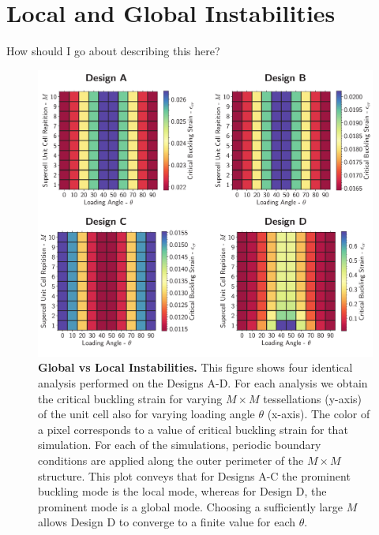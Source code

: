 \documentclass[10pt,twoside]{fernandes_supp}
\newcommand{\mf}[1]{\colorbox{blue!10}{\color{color3}#1}}
\begin{document}
\section{Local and Global Instabilities}
\mf{How should I go about describing this here?}
\begin{figure}
	\centering
	\includegraphics[width=0.7\linewidth]{SFig12.pdf}
	\caption{{\bf Global vs Local Instabilities.} This figure shows four identical analysis performed on the Designs A-D. For each analysis we obtain the critical buckling strain for varying $M\times M$ tessellations (y-axis) of the unit cell also for varying loading angle $\theta$ (x-axis). The color of a pixel corresponds to a value of critical buckling strain for that simulation. For each of the simulations, periodic boundary conditions are applied along the outer perimeter of the $M\times M$ structure. This plot conveys that for Designs A-C the prominent buckling mode is the local mode, whereas for Design D, the prominent mode is a global mode. Choosing a sufficiently large $M$ allows Design D to converge to a finite value for each $\theta$.}
	\label{DomainSize}
\end{figure}



% 
\end{document}
